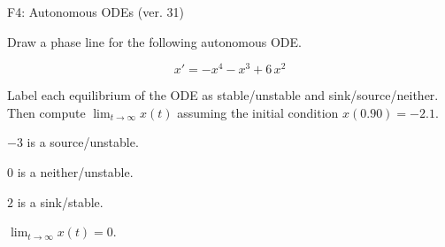 \begin{exercise}
  \begin{exerciseTitle}F4: Autonomous ODEs (ver. 31)\end{exerciseTitle}
  \begin{exerciseStatement}
    

      Draw a phase line for the following 
      autonomous ODE.
    

    
\[x'= -x^{4} - x^{3} + 6 \, x^{2}\]

    

      Label each equilibrium of the ODE
      as stable/unstable and sink/source/neither.
      Then compute \(\lim_{t\to\infty}x(t)\)
      assuming the initial condition
      \(x( 0.90 )= -2.1\).
    

  \end{exerciseStatement}
  \begin{exerciseAnswer}
    

      \(-3\) is a source/unstable.
      
        \(0\) is a neither/unstable.
      
      \(2\) is a sink/stable.
    

    

      \(\lim_{t\to\infty}x(t)=0\).
    

  \end{exerciseAnswer}
\end{exercise}